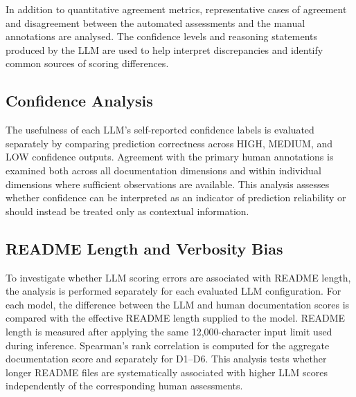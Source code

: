 In addition to quantitative agreement metrics, representative 
cases of agreement and disagreement between the automated 
assessments and the manual annotations are analysed. The 
confidence levels and reasoning statements produced by the LLM 
are used to help interpret discrepancies and identify common 
sources of scoring differences.

\subsection{Confidence Analysis}

The usefulness of each LLM's self-reported confidence labels is
evaluated separately by comparing prediction correctness across HIGH,
MEDIUM, and LOW confidence outputs. Agreement with the primary human
annotations is examined both across all documentation dimensions
and within individual dimensions where sufficient observations are
available. This analysis assesses whether confidence can be
interpreted as an indicator of prediction reliability or should
instead be treated only as contextual information.

\subsection{README Length and Verbosity Bias}

To investigate whether LLM scoring errors are associated with README
length, the analysis is performed separately for each evaluated LLM
configuration. For each model, the difference between the LLM and
human documentation scores is compared with the effective README
length supplied to the model.
README length is measured after applying the same
12,000-character input limit used during inference. Spearman's rank
correlation is computed for the aggregate documentation score and
separately for D1--D6. This analysis tests whether longer README
files are systematically associated with higher LLM scores
independently of the corresponding human assessments.

